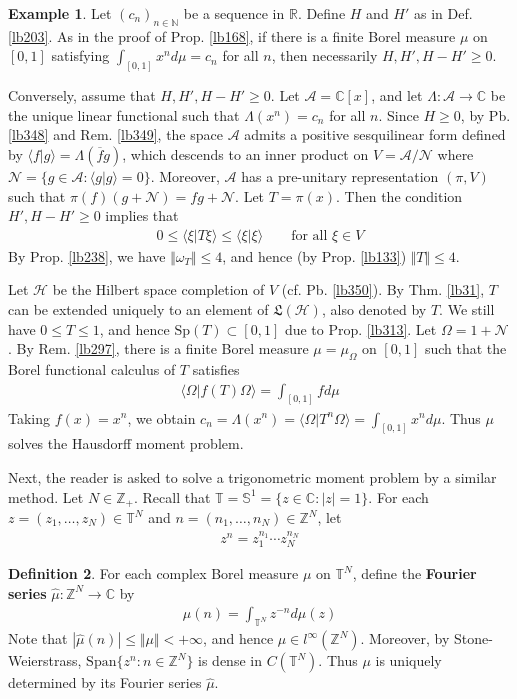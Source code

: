 \documentclass[12pt,b5paper,notitlepage]{article}
\theoremstyle{definition}
\newtheorem{df}{Definition}[subsection]
\newtheorem{eg}[df]{Example}
\theoremstyle{plain}
\newcommand{\fk}{\mathfrak}
\newcommand{\wht}{\widehat}
\newcommand{\ovl}{\overline}
\newcommand{\Span}{\mathrm{Span}}
\newcommand{\bk}[1]{\langle {#1}\rangle}
\newcommand{\scr}{\mathscr}
\newcommand{\Cbb}{\mathbb C}
\newcommand{\Nbb}{\mathbb N}
\newcommand{\Zbb}{\mathbb Z}
\newcommand{\Rbb}{\mathbb R}
\newcommand{\Tbb}{\mathbb T}
\newcommand{\Sp}{\mathrm{Sp}}
\newcommand{\Sbb}{{\mathbb S}}
\newcommand{\MH}{\mathcal H}
\newcommand{\SA}{\mathscr A}
\newcommand{\hqed}{\hfill\qedsymbol}
\numberwithin{equation}{section}
\begin{document}
\begin{eg}\label{lb351}
Let $(c_n)_{n\in\Nbb}$ be a sequence in $\Rbb$. Define $H$ and $H'$ as in Def. \ref{lb203}. As in the proof of Prop. \ref{lb168}, if there is a finite Borel measure $\mu$ on $[0,1]$ satisfying $\int_{[0,1]}x^nd\mu=c_n$ for all $n$, then necessarily $H,H',H-H'\geq0$.

Conversely, assume that $H,H',H-H'\geq0$. Let $\SA=\Cbb[x]$, and let $\Lambda:\SA\rightarrow\Cbb$ be the unique linear functional such that $\Lambda(x^n)=c_n$ for all $n$. Since $H\geq0$, by Pb. \ref{lb348} and Rem. \ref{lb349}, the space $\SA$ admits a positive sesquilinear form defined by $\bk{f|g}=\Lambda(\ovl fg)$, which descends to an inner product on $V=\SA/\scr N$ where $\scr N=\{g\in\SA:\bk{g|g}=0\}$. Moreover, $\SA$ has a pre-unitary representation $(\pi,V)$ such that $\pi(f)(g+\scr N)=fg+\scr N$. Let $T=\pi(x)$. Then the condition $H',H-H'\geq0$ implies that 
\begin{align*}
0\leq\bk{\xi|T\xi}\leq \bk{\xi|\xi}\qquad\text{for all }\xi\in V
\end{align*}
By Prop. \ref{lb238}, we have $\Vert\omega_T\Vert\leq 4$, and hence (by Prop. \ref{lb133}) $\Vert T\Vert\leq 4$.

Let $\MH$ be the Hilbert space completion of $V$ (cf. Pb. \ref{lb350}). By Thm. \ref{lb31}, $T$ can be extended uniquely to an element of $\fk L(\MH)$, also denoted by $T$. We still have $0\leq T\leq 1$, and hence $\Sp(T)\subset[0,1]$ due to Prop. \ref{lb313}. Let $\Omega=1+\scr N$. By Rem. \ref{lb297}, there is a finite Borel measure $\mu=\mu_\Omega$ on $[0,1]$ such that the Borel functional calculus of $T$ satisfies
\begin{align*}
\bk{\Omega|f(T)\Omega}=\int_{[0,1]}fd\mu
\end{align*}
Taking $f(x)=x^n$, we obtain $c_n=\Lambda(x^n)=\bk{\Omega|T^n\Omega}=\int_{[0,1]}x^nd\mu$. Thus $\mu$ solves the Hausdorff moment problem.   \hqed
\end{eg}


Next, the reader is asked to solve a trigonometric moment problem by a similar method. Let $N\in\Zbb_+$. Recall that $\Tbb=\Sbb^1=\{z\in\Cbb:|z|=1\}$. For each $z=(z_1,\dots,z_N)\in\Tbb^N$ and $n=(n_1,\dots,n_N)\in\Zbb^N$, let
\begin{align}
z^n=z_1^{n_1}\cdots z_N^{n_N}
\end{align}

\begin{df}
For each complex Borel measure $\mu$ on $\Tbb^N$, define the \textbf{Fourier series} $\wht\mu:\Zbb^N\rightarrow\Cbb$ by  \index{zz@$\wht\mu$, the Fouerier series of $\mu$}
\begin{align*}
\wht\mu(n)=\int_{\Tbb^N}z^{-n}d\mu(z)
\end{align*} 
Note that $|\wht\mu(n)|\leq \Vert\mu\Vert<+\infty$, and hence $\wht\mu\in l^\infty(\Zbb^N)$. Moreover, by Stone-Weierstrass, $\Span\{z^n:n\in\Zbb^N\}$ is dense in $C(\Tbb^N)$. Thus $\mu$ is uniquely determined by its Fourier series $\wht\mu$.
\end{df}
\end{document}
